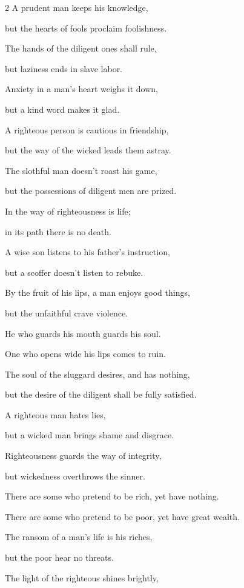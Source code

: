\begin{multicols}{2}
\myverse{}A prudent man keeps his knowledge,

but the hearts of fools proclaim foolishness.


\myverse{}The hands of the diligent ones shall rule,

but laziness ends in slave labor.


\myverse{}Anxiety in a man’s heart weighs it down,

but a kind word makes it glad.


\myverse{}A righteous person is cautious in friendship,

but the way of the wicked leads them astray.


\myverse{}The slothful man doesn’t roast his game,

but the possessions of diligent men are prized.


\myverse{}In the way of righteousness is life;

in its path there is no death.


\mychapter{} \myverse*{}A wise son listens to his father’s instruction,

\quad\quad but a scoffer doesn’t listen to rebuke.


\myverse{}By the fruit of his lips, a man enjoys good things,

but the unfaithful crave violence.


\myverse{}He who guards his mouth guards his soul.

One who opens wide his lips comes to ruin.


\myverse{}The soul of the sluggard desires, and has nothing,

but the desire of the diligent shall be fully satisfied.


\myverse{}A righteous man hates lies,

but a wicked man brings shame and disgrace.


\myverse{}Righteousness guards the way of integrity,

but wickedness overthrows the sinner.


\myverse{}There are some who pretend to be rich, yet have nothing.

There are some who pretend to be poor, yet have great wealth.


\myverse{}The ransom of a man’s life is his riches,

but the poor hear no threats.


\myverse{}The light of the righteous shines brightly,


\end{multicols}
